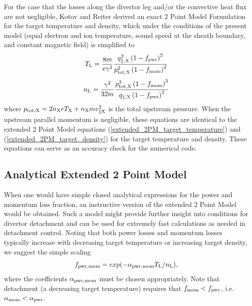 \documentclass[amsmath,amssymb,a4]{revtex4-2}
\begin{document}
For the case that the losses along the divertor leg and/or the convective heat flux are not negligible, Kotov and Reiter \cite{kotov2009} derived an exact 2 Point Model Formulation for the target temperature and density, which under the conditions of the present model (equal electron and ion temperature, sound speed at the sheath boundary, and constant magnetic field) is simplified to
\begin{equation}\label{2PMF_target temperature}
    T_{\rm L} = {8m \over e \gamma^2} {q_{\parallel,\rm X}^2 \left(1-f_{\rm pwr}\right)^2 \over p_{\rm tot,X}^2 \left(1-f_{\rm mom}\right)^2}
\end{equation}
\begin{equation}\label{2PMF_target density}
    n_{\rm L} = {\gamma^2 \over 32 m} {p_{\rm tot,X}^3 \left(1-f_{\rm mom}\right)^3 \over q_{\parallel,\rm X} \left(1-f_{\rm pwr}\right)^2}
\end{equation}
where $p_{\rm tot,X} = 2 n_{\rm X} e T_{\rm X} + n_{\rm X} m v_{\parallel\rm X}^2$ is the total upstream pressure. When the upstream parallel momentum is negligible, these equations are identical to the extended 2 Point Model equations (\ref{extended_2PM_target_temperature}) and (\ref{extended_2PM_target_density}) for the target temperature and density. These equations can serve as an accuracy check for the numerical code.


\subsection{Analytical Extended 2 Point Model}

When one would have simple closed analytical expressions for the power and momentum loss fraction, an instructive version of the extended 2 Point Model would be obtained. Such a model might provide further insight into conditions for divertor detachment and can be used for extremely fast calculations as needed in detachment control. Noting that both power losses and momentum losses typically increase with decreasing target temperature or increasing target density, we suggest the simple scaling
\begin{equation}\label{scaling_of_losses}
    f_{\rm pwr, mom} = exp( - \alpha_{\rm pwr, mom} T_{\rm L} / n_{\rm L} ),
\end{equation}
where the coefficients $\alpha_{\rm pwr, mom}$ must be chosen appropriately. Note that detachment (a decreasing target temperature) requires that $f_{\rm mom} < f_{\rm pwr}$, i.e. $\alpha_{\rm mom} < \alpha_{\rm pwr}$.
\end{document}
